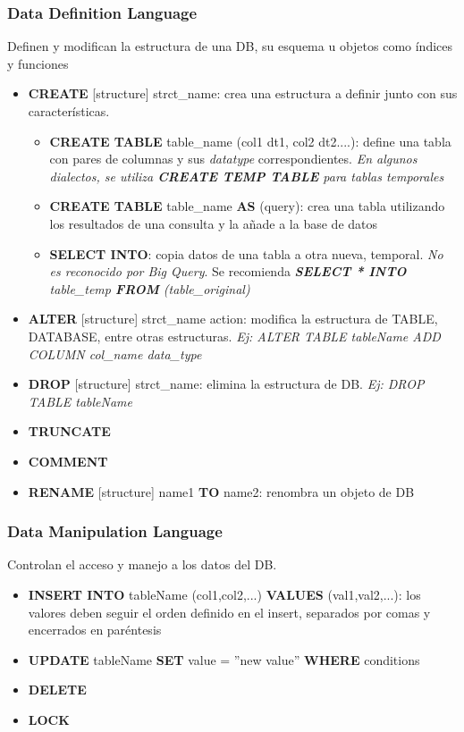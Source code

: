 \subsubsection{Data Definition Language}
Definen y modifican la estructura de una DB, su esquema u objetos como índices y funciones
\begin{itemize}
    \item {\textbf{CREATE} [structure] strct\_name: crea una estructura a definir junto con sus características.
    \begin{itemize}
        \item {\textbf{CREATE TABLE} table\_name (col1 dt1, col2 dt2....): define una tabla con pares de columnas y sus \textit{datatype} correspondientes. \textit{En algunos dialectos, se utiliza \textbf{CREATE TEMP TABLE} para tablas temporales}}
        \item {\textbf{CREATE TABLE} table\_name \textbf{AS} (query): crea una tabla utilizando los resultados de una consulta y la añade a la base de datos}
        \item {\textbf{SELECT INTO}: copia datos de una tabla a otra nueva, temporal. \textit{No es reconocido por Big Query}. Se recomienda \textit{\textbf{SELECT * INTO} table\_temp \textbf{FROM} (table\_original)}}
    \end{itemize}}
    \item {\textbf{ALTER} [structure] strct\_name {action}: modifica la estructura de TABLE, DATABASE, entre otras estructuras. \textit{Ej: ALTER TABLE tableName ADD COLUMN col\_name data\_type}}
    \item {\textbf{DROP} [structure] strct\_name:  elimina la estructura de DB. \textit{Ej: DROP TABLE tableName}}
    \item {\textbf{TRUNCATE}}
    \item {\textbf{COMMENT}}
    \item {\textbf{RENAME} [structure] name1 \textbf{TO} name2: renombra un objeto de DB}
\end{itemize}

\subsubsection{Data Manipulation Language}
Controlan el acceso y manejo a los datos del DB.
\begin{itemize}
    \item {\textbf{INSERT INTO} tableName (col1,col2,...) \textbf{VALUES} (val1,val2,...): los valores deben seguir el orden definido en el insert, separados por comas y encerrados en paréntesis}
    \item {\textbf{UPDATE} tableName \textbf{SET} value = ''new value'' \textbf{WHERE} {conditions}}
    \item {\textbf{DELETE}}
    \item {\textbf{LOCK}}
\end{itemize}

